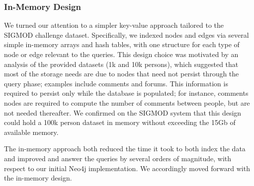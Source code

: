\documentclass{article}
\begin{document}
\subsubsection{In-Memory Design}
We turned our attention to a simpler key-value approach tailored to
the SIGMOD challenge dataset.  Specifically, we indexed nodes and
edges via several simple in-memory arrays and hash tables, with one
structure for each type of node or edge relevant to the queries.  This
design choice was motivated by an analysis of the provided datasets
(1k and 10k persons), which suggested that most of the storage needs
are due to nodes that need not persist through the query phase;
examples include comments and forums. This information is required to
persist only while the database is populated; for instance, comments
nodes are required to compute the number of comments between people,
but are not needed thereafter.  We confirmed on the SIGMOD system that
this design could hold a 100k person dataset in memory without
exceeding the 15Gb of available memory.

The in-memory approach both reduced the time it took to both index the
data and improved and answer the queries by several orders of
magnitude, with respect to our initial Neo4j implementation.  We
accordingly moved forward with the in-memory design.


\end{document}
